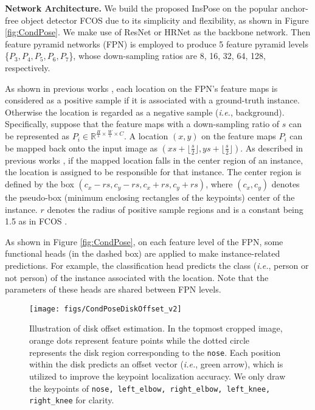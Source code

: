 \documentclass[sigconf]{acmart}
\begin{document}
\textbf{Network Architecture.}\quad
We build the proposed InsPose on the popular anchor-free object detector FCOS \cite{tian2019fcos} due to its simplicity and flexibility,
as shown in Figure \ref{fig:CondPose}. We make use of ResNet \cite{he2016deep} or HRNet \cite{sun2019deep} as the backbone network. Then feature pyramid networks (FPN) \cite{lin2017feature} is employed to produce 5 feature pyramid levels \{$P_{3},P_{4},P_{5},P_{6},P_{7}$\}, whose down-sampling ratios are 8, 16, 32, 64, 128, respectively.

As shown in previous works \cite{ren2015faster, he2015spatial}, each location on the FPN's feature maps is considered as a positive sample if it is associated with a ground-truth instance. Otherwise the location is regarded as a negative sample (\emph{i.e.}, background).
Specifically, suppose that the feature maps with a down-sampling ratio of $s$ can be represented as
\begin{math}
  P_{i} \in \mathbb{R}^{\frac{H}{s} \times \frac{W}{s} \times C}
\end{math}.
A location $(x,y)$ on the feature maps $P_{i}$ can be mapped back onto the input image as
\begin{math}
  \left( xs +\lfloor \frac{s}{2} \rfloor, ys +\lfloor \frac{s}{2} \rfloor \right)
\end{math}.
As described in previous works \cite{tian2019fcos, tian2020conditional}, 
if the mapped location falls in the center region of an instance, the location is assigned to be responsible for that instance.
The center region is defined by the box
\begin{math}
  \left( c_{x}-rs, c_{y}-rs, c_{x}+rs, c_{y}+rs \right)
\end{math}, where
\begin{math}
  \left( c_{x}, c_{y} \right)
\end{math}
denotes the pseudo-box (minimum enclosing rectangles of the keypoints) center of the instance.
$r$ denotes the radius of positive sample regions and is a constant being 1.5 as in FCOS \cite{tian2019fcos}.

As shown in Figure \ref{fig:CondPose}, on each feature level of the FPN, some functional heads (in the dashed box) are applied to make instance-related predictions. For example, the classification head predicts the class (\textit{i.e.}, person or not person) of the instance associated with the location.
Note that the parameters of these heads are shared between FPN levels.


\begin{figure}[t]
  \centering
  \texttt{[image: figs/CondPoseDiskOffset\_v2]}
\caption{Illustration of disk offset estimation. In the topmost cropped image, orange dots represent feature points while the dotted circle represents the disk region corresponding to the \texttt{nose}. Each position within the disk predicts an offset vector (\textit{i.e.}, green arrow), which is utilized to improve the keypoint localization accuracy. We only draw the keypoints of \texttt{nose, left\_elbow, right\_elbow, left\_knee, right\_knee} for clarity.}
  \label{fig:CondPoseDiskOffset}
\end{figure}
\end{document}
